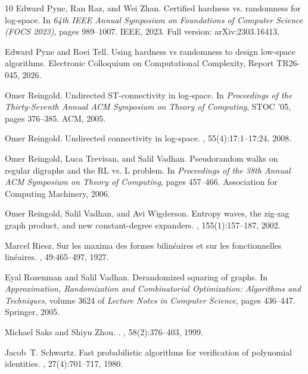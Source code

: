 \documentclass[11pt]{article}
\numberwithin{equation}{section}
\theoremstyle{definition}
\theoremstyle{remark}
\begin{document}
\begin{thebibliography}{10}
Edward Pyne, Ran Raz, and Wei Zhan.
\newblock Certified hardness vs. randomness for log-space.
\newblock In {\em 64th IEEE Annual Symposium on Foundations of Computer Science
  (FOCS 2023)}, pages 989--1007. IEEE, 2023.
\newblock Full version: arXiv:2303.16413.

Edward Pyne and Roei Tell.
\newblock Using hardness vs randomness to design low-space algorithms.
\newblock Electronic Colloquium on Computational Complexity, Report TR26-045,
  2026.

Omer Reingold.
\newblock Undirected {ST}-connectivity in log-space.
\newblock In {\em Proceedings of the Thirty-Seventh Annual ACM Symposium on
  Theory of Computing}, STOC '05, pages 376--385. ACM, 2005.

Omer Reingold.
\newblock Undirected connectivity in log-space.
, 55(4):17:1--17:24, 2008.

Omer Reingold, Luca Trevisan, and Salil Vadhan.
\newblock Pseudorandom walks on regular digraphs and the {RL} vs. {L} problem.
\newblock In {\em Proceedings of the 38th Annual ACM Symposium on Theory of
  Computing}, pages 457--466. Association for Computing Machinery, 2006.

Omer Reingold, Salil Vadhan, and Avi Wigderson.
\newblock Entropy waves, the zig-zag graph product, and new constant-degree
  expanders.
, 155(1):157--187, 2002.

Marcel Riesz.
\newblock Sur les maxima des formes bilin{\'e}aires et sur les fonctionnelles
  lin{\'e}aires.
, 49:465--497, 1927.

Eyal Rozenman and Salil Vadhan.
\newblock Derandomized squaring of graphs.
\newblock In {\em Approximation, Randomization and Combinatorial Optimization:
  Algorithms and Techniques}, volume 3624 of {\em Lecture Notes in Computer
  Science}, pages 436--447. Springer, 2005.

Michael Saks and Shiyu Zhou.
.
, 58(2):376--403, 1999.

Jacob~T. Schwartz.
\newblock Fast probabilistic algorithms for verification of polynomial
  identities.
, 27(4):701--717, 1980.


\end{thebibliography}
\end{document}
